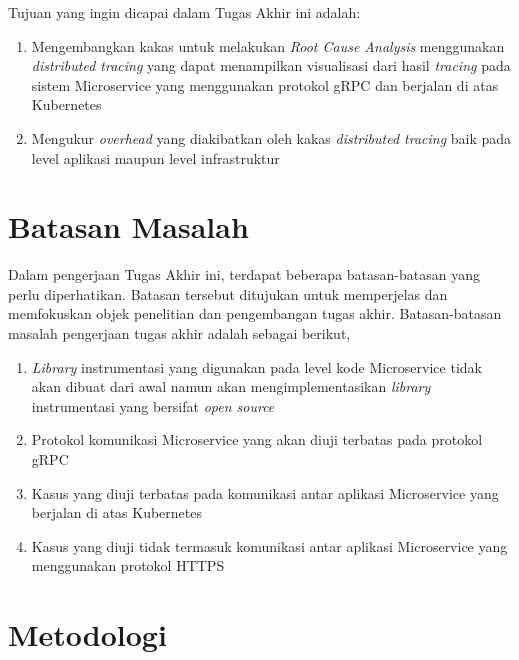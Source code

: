 Tujuan yang ingin dicapai dalam Tugas Akhir ini adalah:
\begin{enumerate}
	\item Mengembangkan kakas untuk melakukan \textit{Root Cause Analysis} menggunakan \textit{distributed tracing}  yang dapat menampilkan visualisasi dari hasil \textit{tracing} pada sistem Microservice yang menggunakan protokol gRPC dan berjalan di atas Kubernetes
	\item Mengukur \textit{overhead} yang diakibatkan oleh kakas \textit{distributed tracing} baik pada level aplikasi maupun level infrastruktur
\end{enumerate}


\section{Batasan Masalah}

Dalam pengerjaan Tugas Akhir ini, terdapat beberapa batasan-batasan yang perlu diperhatikan. Batasan tersebut ditujukan untuk memperjelas dan memfokuskan objek penelitian dan pengembangan tugas akhir. Batasan-batasan masalah pengerjaan tugas akhir adalah sebagai berikut,

\begin{enumerate}
	\item \textit{Library} instrumentasi yang digunakan pada level kode Microservice tidak akan dibuat dari awal namun akan mengimplementasikan \textit{library} instrumentasi yang bersifat \textit{open source}
	\item Protokol komunikasi Microservice yang akan diuji terbatas pada protokol gRPC
	\item Kasus yang diuji terbatas pada komunikasi antar aplikasi Microservice yang berjalan di atas Kubernetes
	\item Kasus yang diuji tidak termasuk komunikasi antar aplikasi Microservice yang menggunakan protokol HTTPS
\end{enumerate}

\section{Metodologi}

